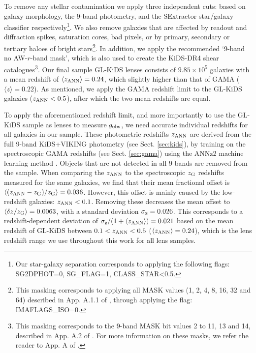 \documentclass[usenatbib]{mnras}
\newcommand*{\meanb}[1]{\langle{#1}\rangle}
\newcommand*{\E}[1]{\times 10^{#1}}
\newcommand{\un}[1]{_{\rm #1}}
\begin{document}
To remove any stellar contamination we apply three independent cuts: based on galaxy morphology, the 9-band photometry, and the SExtractor star/galaxy classifier respectively\footnote{Our star-galaxy separation corresponds to applying the following flags: SG2DPHOT=0, SG\_FLAG=1, CLASS\_STAR<0.5.}. We also remove galaxies that are affected by readout and diffraction spikes, saturation cores, bad pixels, or by primary, secondary or tertiary haloes of bright stars\footnote{This masking corresponds to applying all MASK values (1, 2, 4, 8, 16, 32 and 64) described in App. A.1.1 of \cite{kuijken2019}, through applying the flag: IMAFLAGS\_ISO=0.}. In addition, we apply the recommended `9-band no AW-$r$-band mask', which is also used to create the KiDS-DR4 shear catalogues\footnote{This masking corresponds to the 9-band MASK bit values 2 to 11, 13 and 14, described in App. A.2 of \cite{kuijken2019}. For more information on these masks, we refer the reader to App. A of \cite{kuijken2019}.}. Our final sample GL-KiDS lenses consists of $9.85\E{5}$ galaxies with a mean redshift of $\meanb{z\un{ANN}}=0.24$, which slightly higher than that of GAMA ($\meanb{z}=0.22$). As mentioned, we apply the GAMA redshift limit to the GL-KiDS galaxies ($z\un{ANN}<0.5$), after which the two mean redshifts are equal.

To apply the aforementioned redshift limit, and more importantly to use the GL-KiDS sample as lenses to measure $g\un{obs}$, we need accurate individual redshifts for all galaxies in our sample. These photometric redshifts $z\un{ANN}$ are derived from the full 9-band KiDS+VIKING photometry (see Sect. \ref{sec:kids}), by training on the spectroscopic GAMA redshifts (see Sect. \ref{sec:gama}) using the ANNz2 machine learning method \cite[]{sadeh2016,dejong2017,bilicki2017}. Objects that are not detected in all 9 bands are removed from the sample. When comparing the $z\un{ANN}$ to the spectroscopic $z\un{G}$ redshifts measured for the same galaxies, we find that their mean fractional offset is $\meanb{(z\un{ANN} - z\un{G})/z\un{G}} = 0.036$. However, this offset is mainly caused by the low-redshift galaxies: $z\un{ANN}<0.1$. Removing these decreases the mean offset to $\meanb{\delta z/z\un{G}} = 0.0063$, with a standard deviation $\sigma\un{z} = 0.026$. This corresponds to a redshift-dependent deviation of $\sigma\un{z}/(1+\meanb{z\un{ANN}})=0.021$ based on the mean redshift of GL-KiDS between $0.1 < z\un{ANN} < 0.5$ ($\meanb{z\un{ANN}} = 0.24$), which is the lens redshift range we use throughout this work for all lens samples.
\end{document}
